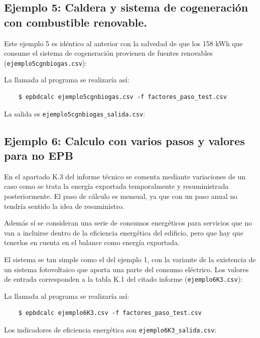 \documentclass[10pt,notitlepage,oneside,a4paper]{article}
\begin{document}

\subsection{Ejemplo 5: Caldera y sistema de cogeneración con combustible renovable.}
Este ejemplo 5 es idéntico al anterior con la salvedad de que los 158 kWh que consume el sistema de cogeneración provienen de fuentes renovables (\texttt{ejemplo5cgnbiogas.csv}):


La llamada al programa se realizaría así:

\begin{verbatim}
    $ epbdcalc ejemplo5cgnbiogas.csv -f factores_paso_test.csv
\end{verbatim}

La salida es \texttt{ejemplo5cgnbiogas\_salida.csv}:



\subsection{Ejemplo 6: Calculo con varios pasos y valores para no EPB}
En el apartado K.3 del informe técnico se comenta mediante variaciones de un caso como se trata la energía exportada temporalmente y resuministrada posteriormente. El paso de cálculo es mensual, ya que con un paso anual no tendría sentido la idea de resuministro.

Además sí se consideran una serie de consumos energéticos para servicios que no van a incluirse dentro de la eficiencia energética del edificio, pero que hay que tenerlos en cuenta en el balance como energía exportada. 

El sistema se tan simple como el del ejemplo 1, con la variante de la existencia de un sistema fotovoltaico que aporta una parte del consumo eléctrico. Los valores de entrada corresponden a la tabla K.1 del citado informe (\texttt{ejemplo6K3.csv}):


La llamada al programa se realizaría así:

\begin{verbatim}
    $ epbdcalc ejemplo6K3.csv -f factores_paso_test.csv
\end{verbatim}

Los indicadores de eficiencia energética son \texttt{ejemplo6K3\_salida.csv}:

\end{document}
